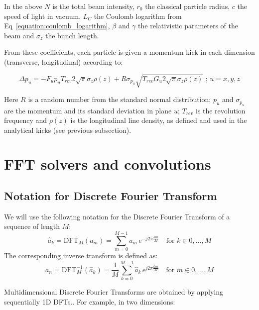 In the above \(N\) is the total beam intensity, \(r_0\) the classical particle radius, \(c\) the speed of light in vacuum, \(L_C\) the Coulomb logarithm from Eq~\eqref{equation:coulomb_logarithm}, \(\beta\) and \(\gamma\) the relativistic parameters of the beam and \(\sigma_z\) the bunch length.
\newline

From these coefficients, each particle is given a momentum kick in each dimension (transverse, longitudinal) according to:

\begin{equation}
    \boxed{\Delta p_u = - F_u p_u T_{rev} 2 \sqrt{\pi} \sigma_z \rho(z) + R \sigma_{p_u} \sqrt{T_{rev} G_u 2 \sqrt{\pi} \sigma_z \rho(z)} \text{ ;   } u=x,y,z}
    \label{equation:momentum_kick_kinetic}
\end{equation}

Here \(R\) is a random number from the standard normal distribution; \(p_u\) and \(\sigma_{p_u}\) are the momentum and its standard deviation in plane \(u\); \(T_{rev}\) is the revolution frequency and \(\rho(z)\) is the longitudinal line density, as defined and used in the analytical kicks (see previous subsection).


\chapter{FFT solvers and convolutions}

\section{Notation for Discrete Fourier Transform}
We will use the following notation for the Discrete Fourier Transform of a sequence of length $M$:
\begin{equation}
\hat{a}_k = \text{DFT}_M(a_m) =  \sum_{m=0}^{M-1} a_m\, e^{-j2\pi  \frac{km}{M}}  \quad \text{for } k \in 0, ..., M
\end{equation}
The corresponding inverse transform is defined as:
\begin{equation}
{a}_n = \text{DFT}^{-1}_M(\hat{a}_k) =  \frac{1}{M}\sum_{k=0}^{M-1} \hat{a}_k\, e^{j2\pi  \frac{km}{M}}  \quad \text{for } m \in 0, ..., M
\end{equation}

Multidimensional Discrete Fourier Transforms are obtained by applying sequentially 1D DFTs.. For example, in two dimensions:

